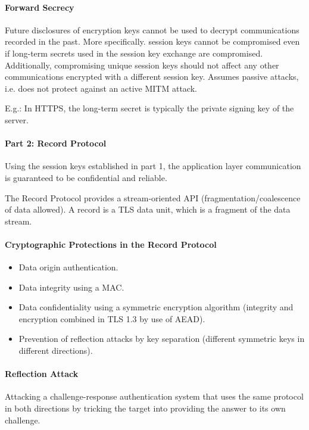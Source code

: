 \paragraph{Forward Secrecy}
Future disclosures of encryption keys cannot be used to decrypt communications recorded in the past. More specifically. session keys cannot be compromised even if long-term secrets used in the session key exchange are compromised. Additionally, compromising unique session keys should not affect any other communications encrypted with a different session key. Assumes passive attacks, i.e. does not protect against an active MITM attack.

E.g.: In HTTPS, the long-term secret is typically the private signing key of the server.

\paragraph{Part 2: Record Protocol}
Using the session keys established in part 1, the application layer communication is guaranteed to be confidential and reliable. 

The Record Protocol provides a stream-oriented API (fragmentation/coalescence of data allowed). A record is a TLS data unit, which is a fragment of the data stream.

\paragraph{Cryptographic Protections in the Record Protocol}
\begin{itemize}
    \item Data origin authentication.
    \item Data integrity using a MAC.
    \item Data confidentiality using a symmetric encryption algorithm (integrity and encryption combined in TLS 1.3 by use of AEAD).
    \item Prevention of reflection attacks by key separation (different symmetric keys in different directions).
\end{itemize}

\paragraph{Reflection Attack}
Attacking a challenge-response authentication system that uses the same protocol in both directions by tricking the target into providing the answer to its own challenge.

